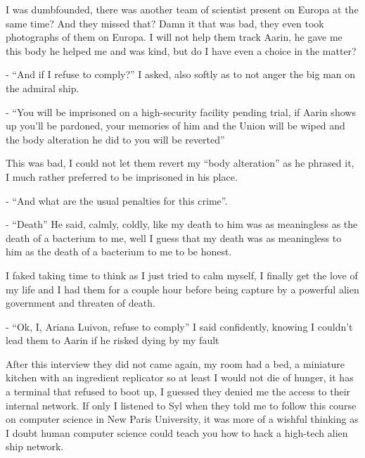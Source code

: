 \documentclass[colorlinks,12pt,a4paper]{book}
\begin{document}
I was dumbfounded, there was another team of scientist present on Europa at the same time? And they missed that? 
Damn it that was bad, they even took photographs of them on Europa.
I will not help them track Aarin, he gave me this body he helped me and was kind, but do I have even a choice in the matter?\par
\bigskip

- “And if I refuse to comply?” I asked, also softly as to not anger the big man on the admiral ship.\par
\bigskip
- “You will be imprisoned on a high-security facility pending trial, if Aarin shows up you'll be pardoned, your memories 
of him and the Union will be wiped and the body alteration he did to you will be reverted”\par
\bigskip

This was bad, I could not let them revert my “body alteration” as he phrased it, I much rather preferred to be imprisoned 
in his place.\par
\bigskip

- “And what are the usual penalties for this crime”.\par
\bigskip
- “Death” He said, calmly, coldly, like my death to him was as meaningless as the death of a bacterium to me, 
well I guess that my death was as meaningless to him as the death of a bacterium to me to be honest.\par
\bigskip

I faked taking time to think as I just tried to calm myself, I finally get the love of my life and I had them for a couple 
hour before being capture by a powerful alien government and threaten of death.\par
\bigskip

- “Ok, I, Ariana Luivon, refuse to comply” I said confidently, knowing I couldn't lead them to Aarin if he risked dying by 
my fault\par
\bigskip

After this interview they did not came again, my room had a bed, a miniature kitchen with an ingredient replicator so at 
least I would not die of hunger, it has a terminal that refused to boot up, I guessed they denied me the access to 
their internal network. If only I listened to Syl when they told me to follow this course on computer science in 
New Paris University, it was more of a wishful thinking as I doubt human computer science could teach you how to hack 
a high-tech alien ship network.\par
\bigskip
\end{document}
